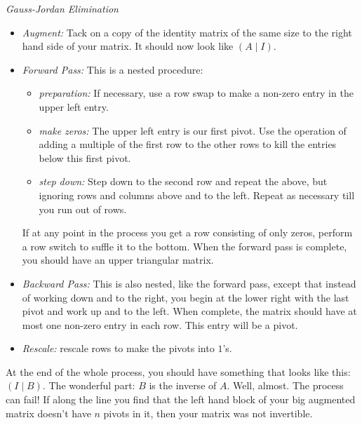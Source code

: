 \documentclass[10pt,]{book}
\theoremstyle{plain}
\theoremstyle{definition}
\numberwithin{equation}{section}
\begin{document}
        \emph{Gauss-Jordan Elimination}
\begin{itemize}
\item{}
          \emph{Augment:} Tack on a copy of the identity matrix of the same
          size to the right hand side of your matrix. It should now look like
          \((A \mid I)\).
        \item{}
          \emph{Forward Pass:} This is a nested procedure:
          \begin{itemize}
\item{}
              \emph{preparation:} If necessary, use a row swap to make a
              non-zero entry in the upper left entry.
            \item{}
              \emph{make zeros:} The upper left entry is our first pivot. Use
              the operation of adding a multiple of the first row to the other
              rows to kill the entries below this first pivot.
            \item{}
              \emph{step down:} Step down to the second row and repeat the
              above, but ignoring rows and columns above and to the left. Repeat
              as necessary till you run out of rows.
            \end{itemize}

          If at any point in the process you get a row consisting of only zeros,
          perform a row switch to suffle it to the bottom. When the forward
          pass is complete, you should have an upper triangular matrix.
        \item{}
          \emph{Backward Pass:} This is also nested, like the forward pass,
          except that instead of working down and to the right, you begin at
          the lower right with the last pivot and work up and to the left.
          When complete, the matrix should have at most one non-zero entry in
          each row. This entry will be a pivot.
        \item{}
          \emph{Rescale:} rescale rows to make the pivots into \(1\)'s.
        \end{itemize}
\par

        At the end of the whole process, you should have something that looks
        like this: \((I \mid B)\). The wonderful part: \(B\) is the
        inverse of \(A\). Well, almost. The process can fail! If along the
        line you find that the left hand block of your big augmented matrix
        doesn't have \(n\) pivots in it, then your matrix was not invertible.
\par
\end{document}
